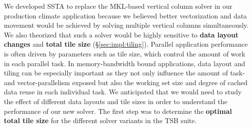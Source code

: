 \documentclass[10pt, conference, compsocconf]{IEEEtran}
\begin{document}
We developed SSTA to replace the MKL-based vertical column solver in our
  production climate application because we believed better vectorization and
  data movement would be achieved by solving multiple vertical columns
  simultaneously.
We also theorized that such a solver would be highly sensitive to
  \textbf{data layout changes} and
  \textbf{total tile size} (\S\ref{sec:impl:tiling}).
Parallel application performance is often driven by parameters such as 
  tile size, which control the amount of work in each parallel task.
In memory-bandwidth bound applications, data layout and tiling can be
  especially important as they not only influence the amount of task- and
  vector-parallelism exposed but also the working set size and degree of cached
  data reuse in each individual task.
We anticipated that we would need to study the effect of different data layouts
  and tile sizes in order to understand the performance of our new solver.
The first step was to determine the \textbf{optimal total tile size} for the 
  different solver variants in the TSB suite.
\end{document}
